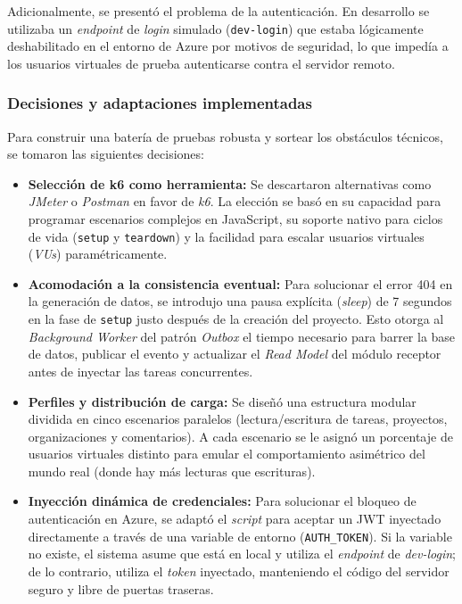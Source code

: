 Adicionalmente, se presentó el problema de la autenticación. En desarrollo se utilizaba un \emph{endpoint} de \emph{login} simulado (\texttt{dev-login}) que estaba lógicamente deshabilitado en el entorno de Azure por motivos de seguridad, lo que impedía a los usuarios virtuales de prueba autenticarse contra el servidor remoto.

\subsubsection{Decisiones y adaptaciones implementadas}
Para construir una batería de pruebas robusta y sortear los obstáculos técnicos, se tomaron las siguientes decisiones:

\begin{itemize}
    \item \textbf{Selección de k6 como herramienta:} Se descartaron alternativas como \emph{JMeter} o \emph{Postman} en favor de \emph{k6}. La elección se basó en su capacidad para programar escenarios complejos en JavaScript, su soporte nativo para ciclos de vida (\texttt{setup} y \texttt{teardown}) y la facilidad para escalar usuarios virtuales (\emph{VUs}) paramétricamente.
    \item \textbf{Acomodación a la consistencia eventual:} Para solucionar el error 404 en la generación de datos, se introdujo una pausa explícita (\emph{sleep}) de 7 segundos en la fase de \texttt{setup} justo después de la creación del proyecto. Esto otorga al \emph{Background Worker} del patrón \emph{Outbox} el tiempo necesario para barrer la base de datos, publicar el evento y actualizar el \emph{Read Model} del módulo receptor antes de inyectar las tareas concurrentes.
    \item \textbf{Perfiles y distribución de carga:} Se diseñó una estructura modular dividida en cinco escenarios paralelos (lectura/escritura de tareas, proyectos, organizaciones y comentarios). A cada escenario se le asignó un porcentaje de usuarios virtuales distinto para emular el comportamiento asimétrico del mundo real (donde hay más lecturas que escrituras).
    \item \textbf{Inyección dinámica de credenciales:} Para solucionar el bloqueo de autenticación en Azure, se adaptó el \emph{script} para aceptar un \ac{JWT} inyectado directamente a través de una variable de entorno (\texttt{AUTH\_TOKEN}). Si la variable no existe, el sistema asume que está en local y utiliza el \emph{endpoint} de \emph{dev-login}; de lo contrario, utiliza el \emph{token} inyectado, manteniendo el código del servidor seguro y libre de puertas traseras.
\end{itemize}

